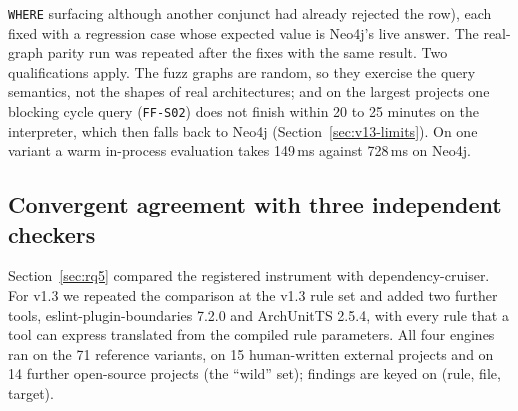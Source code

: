 \documentclass[10pt,a4paper]{article}
\newcommand{\dc}{dependency-cruiser}
\newcommand{\ff}[1]{\texttt{\small #1}}
\begin{document}
\texttt{WHERE} surfacing although another conjunct had already rejected the row), each fixed with a regression case
whose expected value is Neo4j's live answer. The real-graph parity run was repeated after the fixes with the same
result. Two qualifications apply. The fuzz graphs are random, so they exercise the query semantics, not the shapes of
real architectures; and on the largest projects one blocking cycle query (\ff{FF-S02}) does not finish within 20 to 25
minutes on the interpreter, which then falls back to Neo4j (Section~\ref{sec:v13-limits}).
On one variant a warm in-process evaluation takes 149\,ms against 728\,ms on Neo4j.

\subsection{Convergent agreement with three independent checkers}\label{sec:v13-convergent}

Section~\ref{sec:rq5} compared the registered instrument with \dc{}. For v1.3 we repeated the comparison at the
v1.3 rule set and added two further tools, eslint-plugin-boundaries 7.2.0 and ArchUnitTS 2.5.4, with every rule
that a tool can express translated from the compiled rule parameters. All four engines ran on the 71 reference
variants, on 15 human-written external projects and on 14 further open-source projects (the ``wild'' set); findings
are keyed on (rule, file, target).
\end{document}
